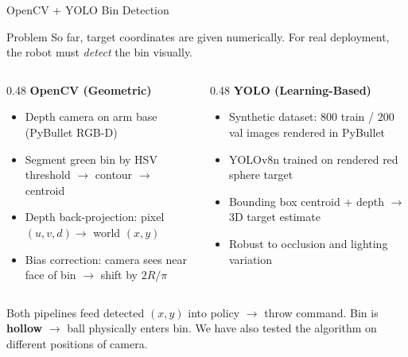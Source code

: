 \documentclass{if-beamer}
\begin{document}
\begin{frame}{OpenCV + YOLO Bin Detection}
    \begin{block}{Problem}
        So far, target coordinates are given numerically. For real deployment, the robot must \textit{detect} the bin visually.
    \end{block}

    \begin{columns}[T]
        \begin{column}{0.48\textwidth}
            \textbf{OpenCV (Geometric)}
            \begin{itemize}
                \item Depth camera on arm base (PyBullet RGB-D)
                \item Segment green bin by HSV threshold $\rightarrow$ contour $\rightarrow$ centroid
                \item Depth back-projection: pixel $(u,v,d) \rightarrow$ world $(x,y)$
                \item Bias correction: camera sees near face of bin $\rightarrow$ shift by $2R/\pi$
            \end{itemize}
        \end{column}
        \begin{column}{0.48\textwidth}
            \textbf{YOLO (Learning-Based)}
            \begin{itemize}
                \item Synthetic dataset: 800 train / 200 val images rendered in PyBullet
                \item YOLOv8n trained on rendered red sphere target
                \item Bounding box centroid + depth $\rightarrow$ 3D target estimate
                \item Robust to occlusion and lighting variation
            \end{itemize}
        \end{column}
    \end{columns}

    \vspace{0.3em}
    Both pipelines feed detected $(x,y)$ into policy $\rightarrow$ throw command. Bin is \textbf{hollow} $\rightarrow$ ball physically enters bin.
    We have also tested the algorithm on different positions of camera.
\end{frame}

\end{document}
